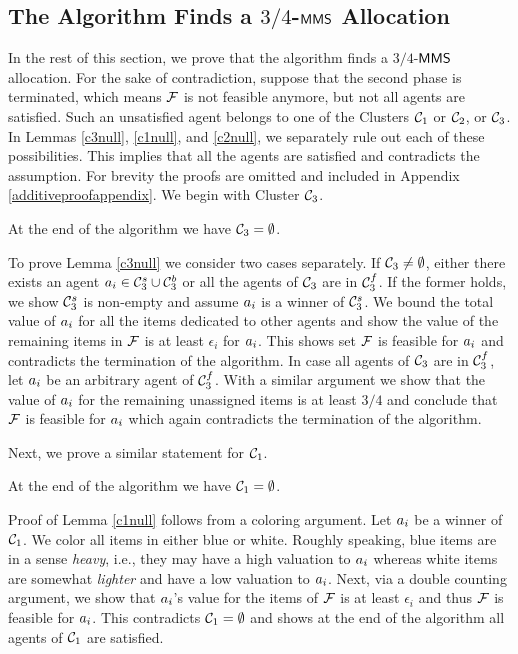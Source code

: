 \subsection{The Algorithm Finds a $3/4$-$\mathsf{MMS}$ Allocation}\label{additiveproofs}
In the rest of this section, we prove that the algorithm finds a $3/4$-$\mathsf{MMS}$ allocation. For the sake of contradiction, suppose that the second phase is terminated, which means $\mathcal{F}$ is not feasible anymore, but not all agents are satisfied. Such an unsatisfied agent belongs to one of the Clusters $\mathcal{C}_1$ or $\mathcal{C}_2$, or $\mathcal{C}_3$. In Lemmas \ref{c3null}, \ref{c1null}, and \ref{c2null}, we separately rule out each of these possibilities. This implies that all the agents are satisfied and contradicts the assumption. For brevity the proofs are omitted and included in Appendix \ref{additiveproofappendix}. We begin with Cluster $\mathcal{C}_3$.
\begin{lemma}
	\label{c3null}
	At the end of the algorithm we have $\mathcal{C}_3 = \emptyset$.
\end{lemma}
%
To prove Lemma \ref{c3null} we consider two cases separately. If $\mathcal{C}_3 \neq \emptyset$, either there exists an agent $a_i \in \mathcal{C}_3^s \cup \mathcal{C}_3^b$ or all the agents of $\mathcal{C}_3$ are in $\mathcal{C}_3^f$. If the former holds, we show $\mathcal{C}_3^s$ is non-empty and assume $a_i$ is a winner of $\mathcal{C}_3^s$. We bound the total value of $a_i$ for all the items dedicated to other agents and show the value of the remaining items in $\mathcal{F}$ is at least $\epsilon_i$ for $a_i$. This shows set $\mathcal{F}$ is feasible for $a_i$ and contradicts the termination of the algorithm. In case all agents of $\mathcal{C}_3$ are in $\mathcal{C}_3^f$, let $a_i$ be an arbitrary agent of $\mathcal{C}_3^f$. With a similar argument we show that the value of $a_i$ for the remaining unassigned items is at least $3/4$ and conclude that $\mathcal{F}$ is feasible for $a_i$ which again contradicts the termination of the algorithm.

Next, we prove a similar statement for $\mathcal{C}_1$. 
\begin{lemma}
	\label{c1null}
	At the end of the algorithm we have $\mathcal{C}_1 = \emptyset$.
\end{lemma}
Proof of Lemma \ref{c1null} follows from a coloring argument. Let $a_i$ be a winner of $\mathcal{C}_1$. We color all items in either blue or white. Roughly speaking, blue items are in a sense \textit{heavy}, i.e., they may have a high valuation to $a_i$ whereas white items are somewhat \textit{lighter} and have a low valuation to $a_i$. Next, via a double counting argument, we show that $a_i$'s value for the items of $\mathcal{F}$ is at least $\epsilon_i$ and thus $\mathcal{F}$ is feasible for $a_i$. This contradicts $\mathcal{C}_1 = \emptyset$ and shows at the end of the algorithm all agents of $\mathcal{C}_1$ are satisfied.

